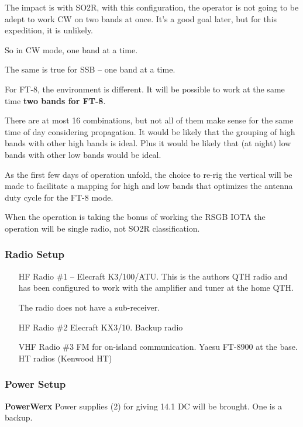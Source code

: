 \documentclass[11pt]{article}
\begin{document}
The impact is with SO2R, with this configuration, the operator is not
going to be adept to work CW on two bands at once.  It's a good goal
later, but for this expedition, it is unlikely. \par
So in CW mode, one band at a time.
\par

The same is true for SSB -- one band at a time.
\par

For FT-8, the environment is different.  It will be possible to work
at the same time {\textbf{two bands for FT-8}}. 
\par

There are at most 16 combinations, but not all of them make sense for
the same time of day considering propagation.  It would be likely that
the grouping of high bands with other high bands is ideal.  Plus it would
be likely that (at night) low bands with other low bands would be ideal.
\par

As the first few days of operation unfold, the choice to re-rig the
vertical will be made to facilitate a mapping for high and low bands
that optimizes the antenna duty cycle for the FT-8 mode.
\par

When the operation is taking the bonus of working the RSGB IOTA
the operation will be single radio, not SO2R classification.

\subsubsection{Radio Setup}

\begin{itemize}
\item[HF Radio \#1] -- Elecraft K3/100/ATU.  This is the authors QTH radio and 
has been configured to work with the amplifier and tuner at the home QTH.
\par
The radio does not have a sub-receiver.
\item[HF Radio \#2] Elecraft KX3/10.  Backup radio
\item[VHF Radio \#3] FM for on-island communication.  Yaesu FT-8900 at the 
base.
HT radios (Kenwood HT)
\end{itemize}

\subsubsection{Power Setup}
{\textbf{PowerWerx}} Power supplies (2) for giving 14.1 DC will be brought.
One is a backup.
\end{document}
